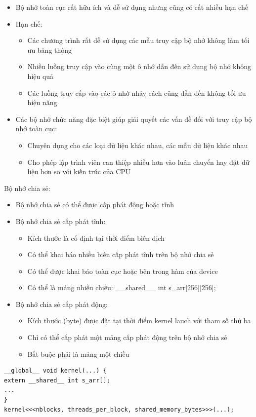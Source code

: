 \documentclass[14pt, a4paper]{article}
\numberwithin{equation}{section}
\numberwithin{figure}{section}
\numberwithin{dl}{section}
\numberwithin{md}{section}
\numberwithin{bd}{section}
\numberwithin{dn}{section}
\numberwithin{hq}{section}
\begin{document}
\begin{itemize}
    \item Bộ nhớ toàn cục rất hữu ích và dễ sử dụng nhưng cũng có rất nhiều hạn chế
    \item Hạn chế:
    \begin{itemize}
        \item Các chương trình rất dễ sử dụng các mẫu truy cập bộ nhớ không làm tối ưu băng thông
        \item Nhiều luồng truy cập vào cùng một ô nhớ dẫn đến sử dụng bộ nhớ không hiệu quả
        \item Các luồng truy cấp vào các ô nhớ nhảy cách cũng dẫn đến không tối ưu hiệu năng
    \end{itemize}
    \item Các bộ nhớ chức năng đặc biệt giúp giải quyết các vấn đề đối với truy cập bộ nhớ toàn cục:
    \begin{itemize}
        \item Chuyên dụng cho các loại dữ liệu khác nhau, các mẫu dữ liệu khác nhau
        \item Cho phép lập trình viên can thiệp nhiều hơn vào luân chuyển hay đặt dữ liệu hơn so với kiến trúc của CPU
    \end{itemize}
\end{itemize}

Bộ nhớ chia sẻ:

\begin{itemize}
    \item Bộ nhớ chia sẻ có thể được cấp phát động hoặc tĩnh
    \item Bộ nhớ chia sẻ cấp phát tĩnh:
    \begin{itemize}
        \item Kích thước là cố định tại thời điểm biên dịch
        \item Có thể khai báo nhiều biến cấp phát tĩnh trên bộ nhớ chia sẻ
        \item Có thể được khai báo toàn cục hoặc bên trong hàm của device
        \item Có thể là mảng nhiều chiều:
        \_\_shared\_\_ int s\_arr[256][256];
    \end{itemize}
\end{itemize}

\begin{itemize}
    \item Bộ nhớ chia sẻ cấp phát động:
    \begin{itemize}
        \item Kích thước (byte) được đặt tại thời điểm kernel lauch với tham số thứ ba 
        \item Chỉ có thể cấp phát một mảng cấp phát động trên bộ nhớ chia sẻ
        \item Bắt buộc phải là mảng một chiều
    \end{itemize}
\end{itemize}
\begin{verbatim}
__global__ void kernel(...) {
extern __shared__ int s_arr[];
...
}
kernel<<<nblocks, threads_per_block, shared_memory_bytes>>>(...);
\end{verbatim}
\end{document}
